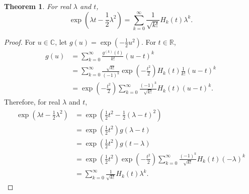 \documentclass{article}
\newtheorem{theorem}{Theorem}
\theoremstyle{definition}
\begin{document}
\begin{theorem}
For real $\lambda$ and $t$,
\[
\exp\left(\lambda t-\frac{1}{2}\lambda^2\right) = \sum_{k=0}^\infty  \frac{1}{\sqrt{k!}} H_k(t) \lambda^k.
\]
\label{generating}
\end{theorem}
\begin{proof}
For $u \in \mathbb{C}$, let $g(u)=\exp\left(-\frac{1}{2}u^2 \right)$. For $t \in \mathbb{R}$,
\begin{align*}
g(u) &= \sum_{k=0}^\infty \frac{g^{(k)}(t)}{k!} (u-t)^k\\
&= \sum_{k=0}^\infty \frac{\sqrt{k!}}{(-1)^k} \exp\left( - \frac{t^2}{2} \right) H_k(t) \frac{1}{k!} (u-t)^k\\
&= \exp\left( - \frac{t^2}{2} \right) \sum_{k=0}^\infty \frac{(-1)^k}{\sqrt{k!}} H_k(t) (u-t)^k.
\end{align*}
Therefore, for real $\lambda$ and $t$,
\begin{align*}
\exp\left(\lambda t-\frac{1}{2}\lambda^2\right)&=\exp\left(\frac{1}{2}t^2 - \frac{1}{2}(\lambda-t)^2 \right)\\
&=\exp\left(\frac{1}{2}t^2\right) g(\lambda-t)\\
&=\exp\left(\frac{1}{2}t^2\right) g(t-\lambda)\\
&=\exp\left(\frac{1}{2}t^2\right)  \exp\left( - \frac{t^2}{2} \right) \sum_{k=0}^\infty \frac{(-1)^k}{\sqrt{k!}} H_k(t) (-\lambda)^k\\
&=\sum_{k=0}^\infty  \frac{1}{\sqrt{k!}} H_k(t) \lambda^k.
\end{align*}
\end{proof}
\end{document}
